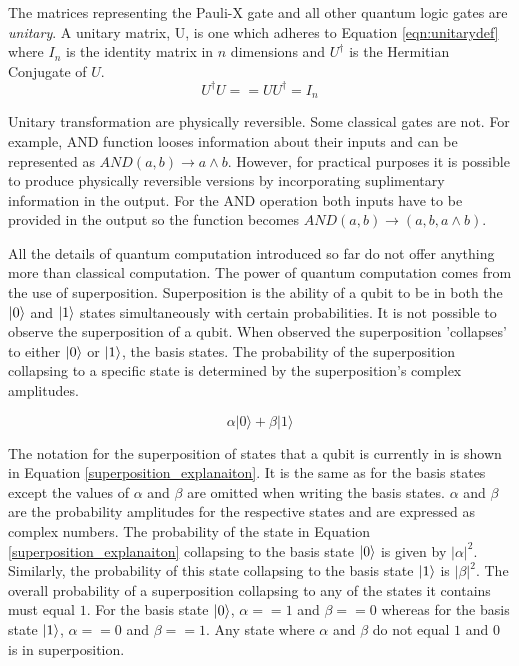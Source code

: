 The matrices representing the Pauli-X gate and all other quantum logic gates are \emph{unitary}.
A unitary matrix, U, is one which adheres to Equation \ref{eqn:unitarydef} where $I_n$ is the identity matrix in $n$ dimensions and $U^{\dagger}$ is the Hermitian Conjugate of $U$.
\begin{equation}
\label{eqn:unitarydef}
U^{\dagger}
U == UU^{\dagger} = I_n
\end{equation}

Unitary transformation are physically reversible.
Some classical gates are not.
For example, AND function looses information about their inputs and can be represented as $AND(a,b)\rightarrow{a\wedge{b}}$.
However, for practical purposes it is possible to produce physically reversible versions by incorporating suplimentary information in the output.
For the AND operation both inputs have to be provided in the output so the function becomes $AND(a,b)\rightarrow{(a,b,a\wedge{b})}$.

All the details of quantum computation introduced so far do not offer anything more than classical computation.
The power of quantum computation comes from the use of superposition.
Superposition is the ability of a qubit to be in both the $\left\vert{0}\right\rangle$ and $\left\vert{1}\right\rangle$ states simultaneously with certain probabilities.
It is not possible to observe the superposition of a qubit.
When observed the superposition 'collapses' to either $\left\vert{0}\right\rangle$ or $\left\vert{1}\right\rangle$, the basis states.
The probability of the superposition collapsing to a specific state is determined by the superposition's complex amplitudes.

\begin{equation}
\label{superposition_explanaiton}
\alpha\vert0\rangle+\beta\vert1\rangle
\end{equation}

The notation for the superposition of states that a qubit is currently in is shown in Equation \ref{superposition_explanaiton}.
It is the same as for the basis states except the values of $\alpha$ and $\beta$ are omitted when writing the basis states.
$\alpha$ and $\beta$ are the probability amplitudes for the respective states and are expressed as complex numbers.
The probability of the state in Equation \ref{superposition_explanaiton} collapsing to the basis state $\left\vert{0}\right\rangle$ is given by $\vert\alpha\vert^2$.
Similarly, the probability of this state collapsing to the basis state $\left\vert{1}\right\rangle$ is $\vert\beta\vert^2$.
The overall probability of a superposition collapsing to any of the states it contains must equal $1$.
For the basis state $\left\vert{0}\right\rangle$, $\alpha==1$ and $\beta==0$ whereas for the basis state $\left\vert{1}\right\rangle$, $\alpha==0$ and $\beta==1$.
Any state where $\alpha$ and $\beta$ do not equal $1$ and $0$ is in superposition.

